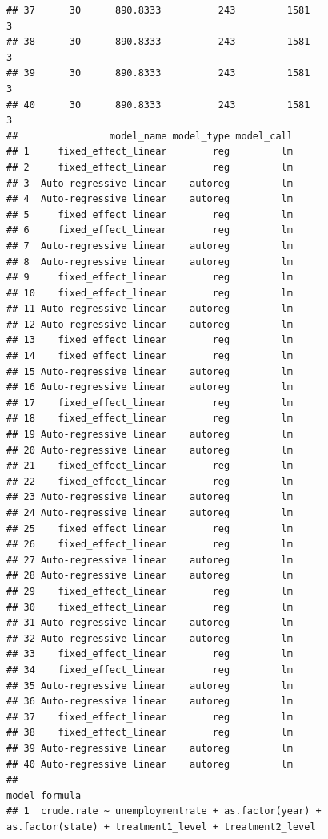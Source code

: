 \documentclass[
]{article}
\begin{document}
\begin{verbatim}
## 37      30      890.8333          243         1581                        3
## 38      30      890.8333          243         1581                        3
## 39      30      890.8333          243         1581                        3
## 40      30      890.8333          243         1581                        3
##                model_name model_type model_call
## 1     fixed_effect_linear        reg         lm
## 2     fixed_effect_linear        reg         lm
## 3  Auto-regressive linear    autoreg         lm
## 4  Auto-regressive linear    autoreg         lm
## 5     fixed_effect_linear        reg         lm
## 6     fixed_effect_linear        reg         lm
## 7  Auto-regressive linear    autoreg         lm
## 8  Auto-regressive linear    autoreg         lm
## 9     fixed_effect_linear        reg         lm
## 10    fixed_effect_linear        reg         lm
## 11 Auto-regressive linear    autoreg         lm
## 12 Auto-regressive linear    autoreg         lm
## 13    fixed_effect_linear        reg         lm
## 14    fixed_effect_linear        reg         lm
## 15 Auto-regressive linear    autoreg         lm
## 16 Auto-regressive linear    autoreg         lm
## 17    fixed_effect_linear        reg         lm
## 18    fixed_effect_linear        reg         lm
## 19 Auto-regressive linear    autoreg         lm
## 20 Auto-regressive linear    autoreg         lm
## 21    fixed_effect_linear        reg         lm
## 22    fixed_effect_linear        reg         lm
## 23 Auto-regressive linear    autoreg         lm
## 24 Auto-regressive linear    autoreg         lm
## 25    fixed_effect_linear        reg         lm
## 26    fixed_effect_linear        reg         lm
## 27 Auto-regressive linear    autoreg         lm
## 28 Auto-regressive linear    autoreg         lm
## 29    fixed_effect_linear        reg         lm
## 30    fixed_effect_linear        reg         lm
## 31 Auto-regressive linear    autoreg         lm
## 32 Auto-regressive linear    autoreg         lm
## 33    fixed_effect_linear        reg         lm
## 34    fixed_effect_linear        reg         lm
## 35 Auto-regressive linear    autoreg         lm
## 36 Auto-regressive linear    autoreg         lm
## 37    fixed_effect_linear        reg         lm
## 38    fixed_effect_linear        reg         lm
## 39 Auto-regressive linear    autoreg         lm
## 40 Auto-regressive linear    autoreg         lm
##                                                                                               model_formula
## 1  crude.rate ~ unemploymentrate + as.factor(year) + as.factor(state) + treatment1_level + treatment2_level

\end{verbatim}
\end{document}

